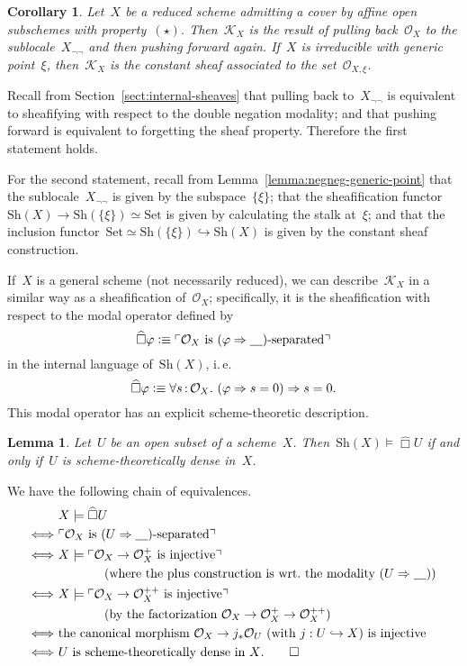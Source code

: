 \documentclass[10pt,reqno,a4paper]{amsbook}
\makeatletter
\theoremstyle{definition}
\theoremstyle{plain}
\newtheorem{cor}[defn]{Corollary}
\newtheorem{lemma}[defn]{Lemma}
\theoremstyle{remark}
\renewcommand{\O}{\mathcal{O}}
\newcommand{\K}{\mathcal{K}}
\newcommand{\placeholder}{\underline{\quad}}
\newcommand{\Set}{\mathrm{Set}}
\newcommand{\Sh}{\mathrm{Sh}}
\newcommand{\?}{\,{:}\,}
\renewcommand{\_}{\mathpunct{.}\,}
\newcommand{\speak}[1]{\ulcorner\text{\textnormal{#1}}\urcorner}
\newcommand{\sdense}{{\widehat\Box}}
\newcommand{\ie}{i.\,e.\@\xspace}
\newcommand{\defequiv}{\vcentcolon\equiv}
\renewenvironment{proof}[1][\proofname]{\par
  \pushQED{\qed}%
  \normalfont \topsep6\p@\@plus6\p@\relax
  \trivlist
  \item[\hskip\labelsep
        \itshape
    #1\@addpunct{.}]\ignorespaces
}{%
  \popQED\endtrivlist\@endpefalse
}
\makeatother
\begin{document}
\begin{cor}Let~$X$ be a reduced scheme admitting a cover by affine open subschemes
with property~$(\star)$. Then~$\K_X$ is the result of
pulling back~$\O_X$ to the sublocale~$X_{\neg\neg}$ and then pushing forward
again. If~$X$ is irreducible with generic point~$\xi$, then~$\K_X$ is the
constant sheaf associated to the set~$\O_{X,\xi}$.\end{cor}
\begin{proof}Recall from Section~\ref{sect:internal-sheaves} that pulling back
to~$X_{\neg\neg}$ is equivalent to sheafifying with respect to the double
negation modality; and that pushing forward is equivalent to forgetting the
sheaf property. Therefore the first statement holds.

For the second statement, recall from Lemma~\ref{lemma:negneg-generic-point} that the
sublocale~$X_{\neg\neg}$ is given by the subspace~$\{\xi\}$; that the
sheafification functor~$\Sh(X) \to \Sh(\{\xi\}) \simeq \Set$ is given by
calculating the stalk at~$\xi$; and that the inclusion functor~$\Set \simeq
\Sh(\{\xi\}) \hookrightarrow \Sh(X)$ is given by the constant sheaf
construction.
\end{proof}

If~$X$ is a general scheme (not necessarily reduced),
we can describe~$\K_X$ in a similar way as a sheafification
of~$\O_X$; specifically, it is the sheafification with respect to the modal
operator defined by
\[ \sdense\varphi \defequiv \speak{$\O_X$ is~$(\varphi \Rightarrow
\placeholder)$-separated} \]
in the internal language of~$\Sh(X)$, \ie
\[ \sdense\varphi \defequiv \forall s\?\O_X\_ (\varphi \Rightarrow s = 0)
\Rightarrow s = 0. \]
This modal operator has an explicit scheme-theoretic description.

\begin{lemma}\label{lemma:scheme-theoretical-density}
Let~$U$ be an open subset of a scheme~$X$. Then~$\Sh(X) \models
\sdense U$ if and only if~$U$ is scheme-theoretically dense in~$X$.
\end{lemma}
\begin{proof}We have the following chain of equivalences.
\begin{align*}
  &\ X \models \sdense U \\
  \Longleftrightarrow&\
    \speak{$\O_X$ is~$(U \Rightarrow \placeholder)$-separated} \\
  \Longleftrightarrow&\
    X \models \speak{$\O_X \to \O_X^{+}$ is injective} \\
  &\qquad\qquad\text{(where the plus construction is wrt.\@ the modality~$(U \Rightarrow \placeholder)$)} \\
  \Longleftrightarrow&\
    X \models \speak{$\O_X \to \O_X^{++}$ is injective} \\
  &\qquad\qquad\text{(by the factorization~$\O_X \to \O_X^{+} \to \O_X^{++}$)} \\
  \Longleftrightarrow&\
    \text{the canonical morphism~$\O_X \to j_* \O_U$
    (with $j : U \hookrightarrow X$) is injective} \\
  \Longleftrightarrow&\
    \text{$U$ is scheme-theoretically dense in~$X$.} \qedhere
\end{align*}
\end{proof}
\end{document}
